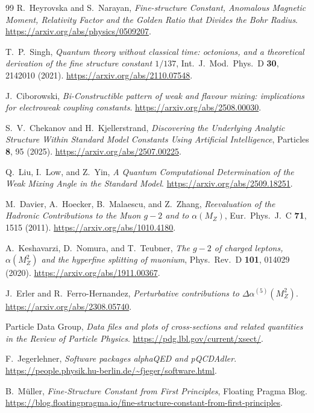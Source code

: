 \documentclass[11pt]{article}
\theoremstyle{remark}
\begin{document}
\begin{thebibliography}{99}
R.\ Heyrovska and S.\ Narayan,
\emph{Fine-structure Constant, Anomalous Magnetic Moment, Relativity Factor and the Golden Ratio that Divides the Bohr Radius}.
\url{https://arxiv.org/abs/physics/0509207}.

T.\ P.\ Singh,
\emph{Quantum theory without classical time: octonions, and a theoretical derivation of the fine structure constant \(1/137\)},
Int.\ J.\ Mod.\ Phys.\ D \textbf{30}, 2142010 (2021).
\url{https://arxiv.org/abs/2110.07548}.

J.\ Ciborowski,
\emph{Bi-Constructible pattern of weak and flavour mixing: implications for electroweak coupling constants}.
\url{https://arxiv.org/abs/2508.00030}.

S.\ V.\ Chekanov and H.\ Kjellerstrand,
\emph{Discovering the Underlying Analytic Structure Within Standard Model Constants Using Artificial Intelligence},
Particles \textbf{8}, 95 (2025).
\url{https://arxiv.org/abs/2507.00225}.

Q.\ Liu, I.\ Low, and Z.\ Yin,
\emph{A Quantum Computational Determination of the Weak Mixing Angle in the Standard Model}.
\url{https://arxiv.org/abs/2509.18251}.

M.\ Davier, A.\ Hoecker, B.\ Malaescu, and Z.\ Zhang,
\emph{Reevaluation of the Hadronic Contributions to the Muon \(g-2\) and to \(\alpha(M_Z)\)},
Eur.\ Phys.\ J.\ C \textbf{71}, 1515 (2011).
\url{https://arxiv.org/abs/1010.4180}.

A.\ Keshavarzi, D.\ Nomura, and T.\ Teubner,
\emph{The \(g-2\) of charged leptons, \(\alpha(M_Z^2)\) and the hyperfine splitting of muonium},
Phys.\ Rev.\ D \textbf{101}, 014029 (2020).
\url{https://arxiv.org/abs/1911.00367}.

J.\ Erler and R.\ Ferro-Hernandez,
\emph{Perturbative contributions to \(\Delta\alpha^{(5)}(M_Z^2)\)}.
\url{https://arxiv.org/abs/2308.05740}.

Particle Data Group,
\emph{Data files and plots of cross-sections and related quantities in the Review of Particle Physics}.
\url{https://pdg.lbl.gov/current/xsect/}.

F.\ Jegerlehner,
\emph{Software packages alphaQED and pQCDAdler}.
\url{https://people.physik.hu-berlin.de/~fjeger/software.html}.

B.\ M\"uller,
\emph{Fine-Structure Constant from First Principles},
Floating Pragma Blog.
\url{https://blog.floatingpragma.io/fine-structure-constant-from-first-principles}.


\end{thebibliography}
\end{document}
